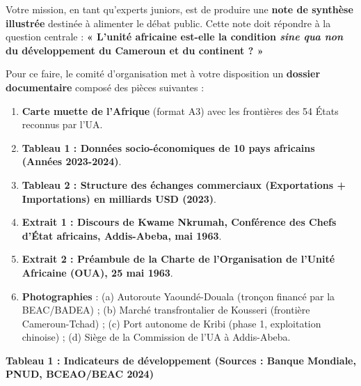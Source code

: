 \documentclass[11pt]{article}
\begin{document}
Votre mission, en tant qu'experts juniors, est de produire une \textbf{note de synthèse illustrée} destinée à alimenter le débat public. Cette note doit répondre à la question centrale : \textbf{« L'unité africaine est-elle la condition \emph{sine qua non} du développement du Cameroun et du continent ? »}

Pour ce faire, le comité d'organisation met à votre disposition un \textbf{dossier documentaire} composé des pièces suivantes :

\begin{enumerate}
    \item \textbf{Carte muette de l'Afrique} (format A3) avec les frontières des 54 États reconnus par l'UA.
    \item \textbf{Tableau 1 : Données socio-économiques de 10 pays africains (Années 2023-2024)}.
    \item \textbf{Tableau 2 : Structure des échanges commerciaux (Exportations + Importations) en milliards USD (2023)}.
    \item \textbf{Extrait 1 : Discours de Kwame Nkrumah, Conférence des Chefs d'État africains, Addis-Abeba, mai 1963}. 
    \item \textbf{Extrait 2 : Préambule de la Charte de l'Organisation de l'Unité Africaine (OUA), 25 mai 1963}.
    \item \textbf{Photographies} : (a) Autoroute Yaoundé-Douala (tronçon financé par la BEAC/BADEA) ; (b) Marché transfrontalier de Kousseri (frontière Cameroun-Tchad) ; (c) Port autonome de Kribi (phase 1, exploitation chinoise) ; (d) Siège de la Commission de l'UA à Addis-Abeba.
\end{enumerate}

\textbf{Tableau 1 : Indicateurs de développement (Sources : Banque Mondiale, PNUD, BCEAO/BEAC 2024)}
\end{document}
